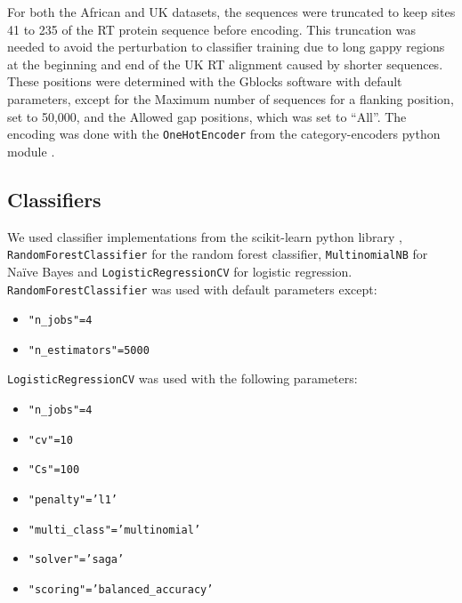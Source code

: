 \documentclass[
  11pt,
  twoside]{scrbook}
\providecommand{\tightlist}{%
  \setlength{\itemsep}{0pt}\setlength{\parskip}{0pt}}
\begin{document}
For both the African and UK datasets, the sequences were truncated to keep sites 41 to 235 of the RT protein sequence before encoding. This truncation was needed to avoid the perturbation to classifier training due to long gappy regions at the beginning and end of the UK RT alignment caused by shorter sequences. These positions were determined with the Gblocks software \autocite{castresanaSelectionConservedBlocks2000} with default parameters, except for the Maximum number of sequences for a flanking position, set to 50,000, and the Allowed gap positions, which was set to ``All''. The encoding was done with the \texttt{OneHotEncoder} from the category-encoders python module \autocite{mcginnisScikitLearnContribCategoricalEncodingRelease2018}.

\hypertarget{classifiers}{%
\subsection{Classifiers}\label{classifiers}}

We used classifier implementations from the scikit-learn python library \autocite{pedregosaScikitlearnMachineLearning2011}, \texttt{RandomForestClassifier} for the random forest classifier, \texttt{MultinomialNB} for Naïve Bayes and \texttt{LogisticRegressionCV} for logistic regression.\\
\texttt{RandomForestClassifier} was used with default parameters except:

\begin{itemize}
\tightlist
\item
  \texttt{"n\_jobs"=4}
\item
  \texttt{"n\_estimators"=5000}
\end{itemize}

\texttt{LogisticRegressionCV} was used with the following parameters:

\begin{itemize}
\tightlist
\item
  \texttt{"n\_jobs"=4}
\item
  \texttt{"cv"=10}
\item
  \texttt{"Cs"=100}
\item
  \texttt{"penalty"=’l1’}
\item
  \texttt{"multi\_class"=’multinomial’}
\item
  \texttt{"solver"=’saga’}
\item
  \texttt{"scoring"=’balanced\_accuracy’}
\end{itemize}
\end{document}
